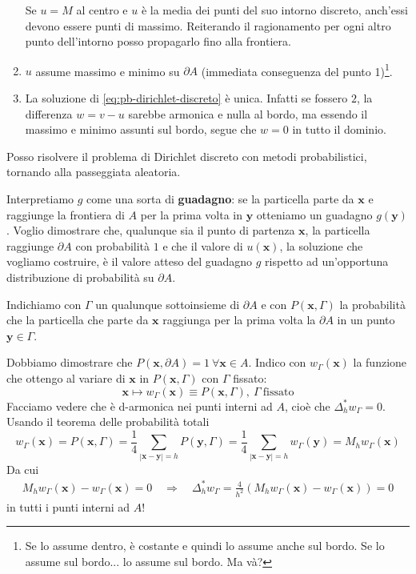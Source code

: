 \documentclass[10pt,a4paper,twoside,openright]{book}
\newcommand{\x}{\mathbf{x}}
\newcommand{\y}{\mathbf{y}}
\begin{document}
\begin{enumerate}
\begin{figure}[htpb]
\begin{tikzpicture}[x=0.75pt,y=0.75pt,yscale=-1,xscale=1]
              \end{tikzpicture}
          \end{figure}
          \FloatBarrier
          Se $u=M$ al centro e $u$ è la media dei punti del suo intorno discreto, anch'essi devono essere punti di massimo. Reiterando il ragionamento per ogni altro punto dell'intorno posso propagarlo fino alla frontiera.
    \item $u$ assume massimo e minimo su $\partial A$ (immediata conseguenza del punto 1)\footnote{Se lo assume dentro, è costante e quindi lo assume anche sul bordo. Se lo assume sul bordo... lo assume sul bordo. Ma và?}.
    \item La soluzione di \eqref{eq:pb-dirichlet-discreto} è unica. Infatti se fossero $2$, la differenza $w=v-u$ sarebbe armonica e nulla al bordo, ma essendo il massimo e minimo assunti sul bordo, segue che $w=0$ in tutto il dominio.
\end{enumerate}
Posso risolvere il problema di Dirichlet discreto con metodi probabilistici, tornando alla passeggiata aleatoria.

Interpretiamo $g$ come una sorta di \textbf{guadagno}: se la particella parte da $\x$ e raggiunge la frontiera di $A$ per la prima volta in $\y$ otteniamo un guadagno $g(\y)$. Voglio dimostrare che, qualunque sia il punto di partenza $\x$, la particella raggiunge $\partial A$ con probabilità $1$ e che il valore di $u(\x)$, la soluzione che vogliamo costruire, è il valore atteso del guadagno $g$ rispetto ad un'opportuna distribuzione di probabilità su $\partial A$.

Indichiamo con $\Gamma $ un qualunque sottoinsieme di $\partial A$ e con $P(\x,\Gamma)$ la probabilità che la particella che parte da $\x$ raggiunga per la prima volta la $\partial A$ in un punto $\y\in \Gamma $.

Dobbiamo dimostrare che $P(\x,\partial A) =1\ \forall \x\in A$. Indico con $w_{\Gamma }(\x)$ la funzione che ottengo al variare di $\x$ in $P(\x,\Gamma)$ con $\Gamma $ fissato:
\begin{equation*}
    \x\longmapsto w_{\Gamma }(\x) \equiv P(\x,\Gamma),\ \Gamma \ \text{fissato}
\end{equation*}
Facciamo vedere che è d-armonica nei punti interni ad $A$, cioè che $\Delta ^{*}_{h} w_{\Gamma } =0$. Usando il teorema delle probabilità totali
\begin{equation*}
    w_{\Gamma }(\x) =P(\x,\Gamma) =\frac{1}{4}\sum _{| \x-\y| =h} P(\y,\Gamma) =\frac{1}{4}\sum _{| \x-\y| =h} w_{\Gamma }(\y) =M_{h} w_{\Gamma }(\x)
\end{equation*}
Da cui
\begin{gather*}
    M_{h} w_{\Gamma }(\x) -w_{\Gamma }(\x) =0 \quad \Rightarrow \quad \Delta ^{*}_{h} w_{\Gamma } =\frac{4}{h^{2}}(M_{h} w_{\Gamma }(\x) -w_{\Gamma }(\x)) =0
\end{gather*}
in tutti i punti interni ad $A$!
\end{document}
